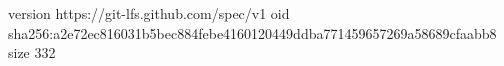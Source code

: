 version https://git-lfs.github.com/spec/v1
oid sha256:a2e72ec816031b5bec884febe4160120449ddba771459657269a58689cfaabb8
size 332
